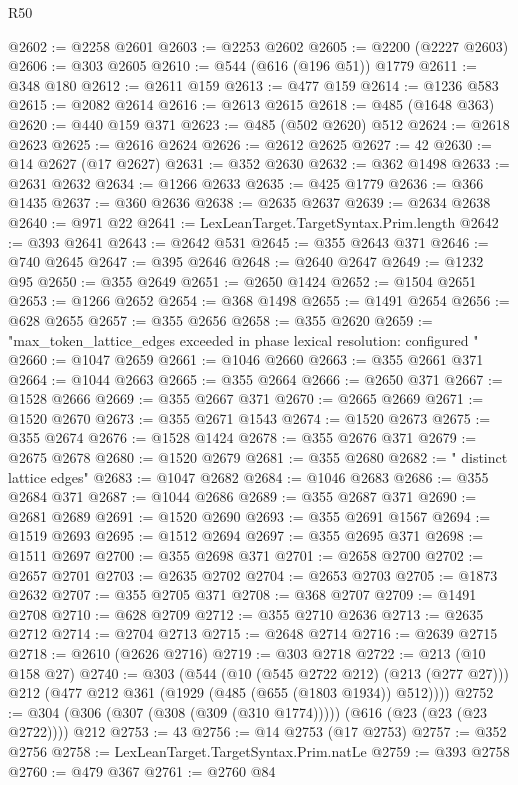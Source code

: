 \begin{lexlean}{R50}
\begin{coremodule}
@2602 := @2258 @2601
@2603 := @2253 @2602
@2605 := @2200 (@2227 @2603)
@2606 := @303 @2605
@2610 := @544 (@616 (@196 @51)) @1779
@2611 := @348 @180
@2612 := @2611 @159
@2613 := @477 @159
@2614 := @1236 @583
@2615 := @2082 @2614
@2616 := @2613 @2615
@2618 := @485 (@1648 @363)
@2620 := @440 @159 @371
@2623 := @485 (@502 @2620) @512
@2624 := @2618 @2623
@2625 := @2616 @2624
@2626 := @2612 @2625
@2627 := 42
@2630 := @14 @2627 (@17 @2627)
@2631 := @352 @2630
@2632 := @362 @1498
@2633 := @2631 @2632
@2634 := @1266 @2633
@2635 := @425 @1779
@2636 := @366 @1435
@2637 := @360 @2636
@2638 := @2635 @2637
@2639 := @2634 @2638
@2640 := @971 @22
@2641 := LexLeanTarget.TargetSyntax.Prim.length
@2642 := @393 @2641
@2643 := @2642 @531
@2645 := @355 @2643 @371
@2646 := @740 @2645
@2647 := @395 @2646
@2648 := @2640 @2647
@2649 := @1232 @95
@2650 := @355 @2649
@2651 := @2650 @1424
@2652 := @1504 @2651
@2653 := @1266 @2652
@2654 := @368 @1498
@2655 := @1491 @2654
@2656 := @628 @2655
@2657 := @355 @2656
@2658 := @355 @2620
@2659 := "max_token_lattice_edges exceeded in phase lexical resolution: configured "
@2660 := @1047 @2659
@2661 := @1046 @2660
@2663 := @355 @2661 @371
@2664 := @1044 @2663
@2665 := @355 @2664
@2666 := @2650 @371
@2667 := @1528 @2666
@2669 := @355 @2667 @371
@2670 := @2665 @2669
@2671 := @1520 @2670
@2673 := @355 @2671 @1543
@2674 := @1520 @2673
@2675 := @355 @2674
@2676 := @1528 @1424
@2678 := @355 @2676 @371
@2679 := @2675 @2678
@2680 := @1520 @2679
@2681 := @355 @2680
@2682 := " distinct lattice edges"
@2683 := @1047 @2682
@2684 := @1046 @2683
@2686 := @355 @2684 @371
@2687 := @1044 @2686
@2689 := @355 @2687 @371
@2690 := @2681 @2689
@2691 := @1520 @2690
@2693 := @355 @2691 @1567
@2694 := @1519 @2693
@2695 := @1512 @2694
@2697 := @355 @2695 @371
@2698 := @1511 @2697
@2700 := @355 @2698 @371
@2701 := @2658 @2700
@2702 := @2657 @2701
@2703 := @2635 @2702
@2704 := @2653 @2703
@2705 := @1873 @2632
@2707 := @355 @2705 @371
@2708 := @368 @2707
@2709 := @1491 @2708
@2710 := @628 @2709
@2712 := @355 @2710 @2636
@2713 := @2635 @2712
@2714 := @2704 @2713
@2715 := @2648 @2714
@2716 := @2639 @2715
@2718 := @2610 (@2626 @2716)
@2719 := @303 @2718
@2722 := @213 (@10 @158 @27)
@2740 := @303
    (@544
      (@10 (@545 @2722 @212) (@213 (@277 @27)))
      @212
      (@477 @212 @361 (@1929 (@485 (@655 (@1803 @1934)) @512))))
@2752 := @304 (@306 (@307 (@308 (@309 (@310 @1774))))) (@616 (@23 (@23 (@23 @2722)))) @212
@2753 := 43
@2756 := @14 @2753 (@17 @2753)
@2757 := @352 @2756
@2758 := LexLeanTarget.TargetSyntax.Prim.natLe
@2759 := @393 @2758
@2760 := @479 @367
@2761 := @2760 @84

\end{coremodule}
\end{lexlean}
